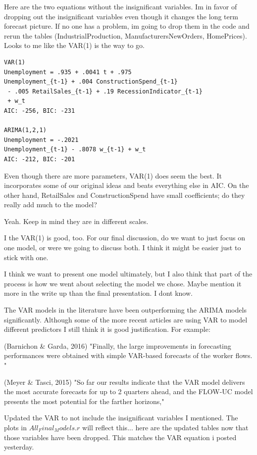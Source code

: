 \documentclass[twoside,twocolumn]{article}
\begin{document}
Here are the two equations without the insignificant variables. Im in favor of dropping out the insignificant variables even though it changes the long term forecast picture. If no one has a problem, im going to drop them in the code and rerun the tables (IndustrialProduction, ManufacturersNewOrders, HomePrices). Looks to me like the VAR(1) is the way to go.

\begin{verbatim}
VAR(1)
Unemployment = .935 + .0041 t + .975 
Unemployment_{t-1} + .004 ConstructionSpend_{t-1}
 - .005 RetailSales_{t-1} + .19 RecessionIndicator_{t-1}
 + w_t
AIC: -256, BIC: -231

ARIMA(1,2,1)
Unemployment = -.2021 
Unemployment_{t-1} - .8078 w_{t-1} + w_t
AIC: -212, BIC: -201
\end{verbatim}

Even though there are more parameters, VAR(1) does seem the best. It incorporates some of our original ideas and beats everything else in AIC. On the other hand, RetailSales and ConstructionSpend have small coefficients; do they really add much to the model?

Yeah. Keep in mind they are in different scales.

I the VAR(1) is good, too. For our final discussion, do we want to just focus on one model, or were we going to discuss both. I think it might be easier just to stick with one.

I think we want to present one model ultimately, but I also think that part of the process is how we went about selecting the model we chose. Maybe mention it more in the write up than the final presentation. I dont know.



The VAR models in the literature have been outperforming the ARIMA models significantly. Although some of the more recent articles are using VAR to model different predictors I still think it is good justification. For example:

(Barnichon \& Garda, 2016)
"Finally, the large improvements in forecasting performances were obtained with simple VAR-based forecasts of the worker flows. "

(Meyer \& Tasci, 2015)
"So far our results indicate that the VAR model delivers the most accurate forecasts for up to 2 quarters ahead, and the FLOW-UC model presents the most potential for the farther
horizons,"

Updated the VAR to not include the insignificant variables I mentioned. The plots in \(All_Final_Models.r\) will reflect this... here are the updated tables now that those variables have been dropped. This matches the VAR equation i posted yesterday.
\end{document}
